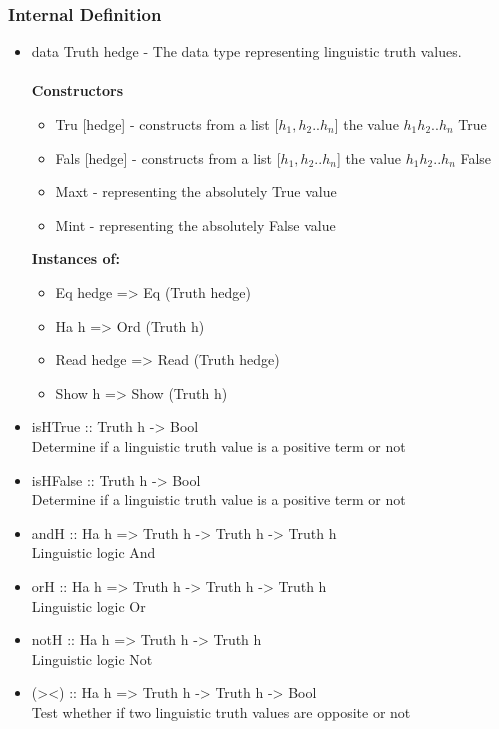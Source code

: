 \documentclass[../gr-final.tex]{subfiles}
\begin{document}
\subsubsection{Internal Definition}
\begin{itemize}
\item data Truth hedge - The data type representing linguistic
        truth values.\\\\
        {\bfseries Constructors}
      \begin{itemize}
              \item Tru [hedge] - constructs from a list
                      [$h_1,h_2..h_n$] the value $h_1 h_2 ..
                h_n$ True
        \item Fals [hedge] - constructs from a list
                      [$h_1,h_2..h_n$] the value $h_1 h_2 ..
                h_n$ False 
        \item Maxt - representing the absolutely True value
        \item Mint - representing the absolutely False value
      \end{itemize}
        {\bfseries Instances of:}
        \begin{itemize}
          \item Eq hedge => Eq (Truth hedge)
          \item Ha h => Ord (Truth h)
          \item Read hedge => Read (Truth hedge)
          \item Show h => Show (Truth h)
        \end{itemize}

\item isHTrue :: Truth h -> Bool\\
        Determine if a linguistic truth value is a positive term
        or not
\item isHFalse :: Truth h -> Bool\\
        Determine if a linguistic truth value is a positive term
        or not
\item andH :: Ha h => Truth h -> Truth h -> Truth h\\
        Linguistic logic And
\item orH :: Ha h => Truth h -> Truth h -> Truth h\\
        Linguistic logic Or
\item notH :: Ha h => Truth h -> Truth h\\
        Linguistic logic Not
\item (><) :: Ha h => Truth h -> Truth h -> Bool\\
        Test whether if two linguistic truth values are opposite or not
\end{itemize}
\end{document}
